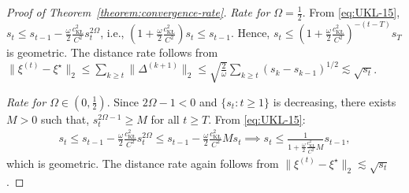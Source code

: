 \documentclass[12pt]{article}
\numberwithin{equation}{section}
\begin{document}
\begin{proof}[Proof of Theorem~\ref{theorem:convergence-rate}]
\noindent
\emph{Rate for $\Omega = \frac{1}{2}$}. From \eqref{eq:UKL-15}, $s_t \leq s_{t-1} - \frac{\omega}{2}\frac{c_{\mathrm{K\text{\L}}}^{2}}{C^2}s_t^{2\Omega}$, i.e., $(1 + \frac{\omega}{2}\frac{c_{\mathrm{K\text{\L}}}^{2}}{C^2})s_t \leq s_{t-1}$. Hence, $s_{t} \leq (1+\frac{\omega}{2}\frac{c_{\mathrm{K\text{\L}}}^{2}}{C^2})^{-(t-T)}s_T$ is geometric. The distance rate follows from $\lVert \xi^{(t)} - \xi^{\star}\rVert_{2} \leq \sum_{k\geq t} \lVert \Delta ^{(k+1)}\rVert_2 \leq \sqrt{\tfrac{2}{\omega}}\sum_{k\geq t}(s_k - s_{k-1})^{1/2} \lesssim \sqrt{s_t}$.

\noindent
\emph{Rate for $\Omega \in (0, \frac{1}{2})$}. Since $2\Omega -1 < 0$ and $\{s_t: t\geq 1\}$ is decreasing, there exists $M>0$ such that, $s_t^{2\Omega -1} \geq M$ for all $t\geq T$. From \eqref{eq:UKL-15}:
\begin{align}\label{eq:UKL-16}
    s_t \leq s_{t-1} - \frac{\omega}{2}\frac{c_{\mathrm{K\text{\L}}}^{2}}{C^2}s_t^{2\Omega} \leq s_{t-1} - \frac{\omega}{2}\frac{c_{\mathrm{K\text{\L}}}^{2}}{C^2}M s_t\implies s_t \leq \frac{1}{1 + \frac{\omega}{2}\frac{c_{\mathrm{K\text{\L}}}^{2}}{C^2}M}s_{t-1},
\end{align}
which is geometric. The distance rate again follows from $\lVert \xi^{(t)} - \xi^{\star}\rVert_2 \lesssim \sqrt{s_t}$.


\end{proof}
\end{document}
